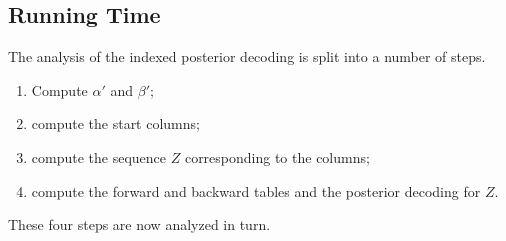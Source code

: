 \subsection{Running Time}
\label{sec:running-time-2}

The analysis of the indexed posterior decoding is split into a number of
steps.
\begin{enumerate}
\item Compute $\alpha'$ and $\beta'$;
\item compute the start columns;
\item compute the sequence $Z$ corresponding to the columns;
\item compute the forward and backward tables and the posterior decoding for
  $Z$.
\end{enumerate}
These four steps are now analyzed in turn.

